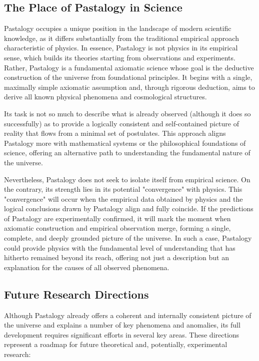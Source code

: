 \documentclass[pdflatex,sn-mathphys-num,referee]{sn-jnl}
\begin{document}
\subsection{The Place of Pastalogy in Science}\label{subsec:place-in-science}

Pastalogy occupies a unique position in the landscape of modern scientific knowledge, as it differs substantially from the traditional empirical approach characteristic of physics. In essence, Pastalogy is not physics in its empirical sense, which builds its theories starting from observations and experiments. Rather, Pastalogy is a fundamental axiomatic science whose goal is the deductive construction of the universe from foundational principles. It begins with a single, maximally simple axiomatic assumption and, through rigorous deduction, aims to derive all known physical phenomena and cosmological structures.

Its task is not so much to describe what is already observed (although it does so successfully) as to provide a logically consistent and self-contained picture of reality that flows from a minimal set of postulates. This approach aligns Pastalogy more with mathematical systems or the philosophical foundations of science, offering an alternative path to understanding the fundamental nature of the universe.

Nevertheless, Pastalogy does not seek to isolate itself from empirical science. On the contrary, its strength lies in its potential "convergence" with physics. This "convergence" will occur when the empirical data obtained by physics and the logical conclusions drawn by Pastalogy align and fully coincide. If the predictions of Pastalogy are experimentally confirmed, it will mark the moment when axiomatic construction and empirical observation merge, forming a single, complete, and deeply grounded picture of the universe. In such a case, Pastalogy could provide physics with the fundamental level of understanding that has hitherto remained beyond its reach, offering not just a description but an explanation for the causes of all observed phenomena.

\subsection{Future Research Directions}\label{subsec:future-directions}

Although Pastalogy already offers a coherent and internally consistent picture of the universe and explains a number of key phenomena and anomalies, its full development requires significant efforts in several key areas. These directions represent a roadmap for future theoretical and, potentially, experimental research:
\end{document}
